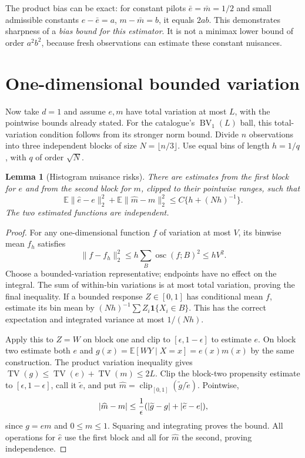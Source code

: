 \documentclass[11pt,a4paper]{article}
\newtheorem{lemma}[theorem]{Lemma}
\theoremstyle{definition}
\theoremstyle{remark}
\newcommand{\E}{\mathbb{E}}
\newcommand{\ind}{\mathbf{1}}
\begin{document}
The product bias can be exact: for constant pilots $\bar e=\bar m=1/2$ and small admissible constants $e-\bar e=a$, $m-\bar m=b$, it equals $2ab$. This demonstrates sharpness of a \emph{bias bound for this estimator}. It is not a minimax lower bound of order $a^2b^2$, because fresh observations can estimate these constant nuisances.
\section{One-dimensional bounded variation}
Now take $d=1$ and assume $e,m$ have total variation at most $L$, with the pointwise bounds already stated. For the catalogue's $\operatorname{BV}_1(L)$ ball, this total-variation condition follows from its stronger norm bound. Divide $n$ observations into three independent blocks of size $N=\lfloor n/3\rfloor$. Use equal bins of length $h=1/q$, with $q$ of order $\sqrt N$.
\begin{lemma}[Histogram nuisance risks]
There are estimates from the first block for $e$ and from the second block for $m$, clipped to their pointwise ranges, such that
\[
 \E\|\widehat e-e\|_2^2+\E\|\widehat m-m\|_2^2
 \le C\{h+(Nh)^{-1}\}.
\]
The two estimated functions are independent.
\end{lemma}
\begin{proof}
For any one-dimensional function $f$ of variation at most $V$, its binwise mean $f_h$ satisfies
\[
 \|f-f_h\|_2^2\le h\sum_B\operatorname{osc}(f;B)^2
                     \le h V^2.
\]
Choose a bounded-variation representative; endpoints have no effect on the integral. The sum of within-bin variations is at most total variation, proving the final inequality. If a bounded response $Z\in[0,1]$ has conditional mean $f$, estimate its bin mean by $(Nh)^{-1}\sum Z_i\ind\{X_i\in B\}$. This has the correct expectation and integrated variance at most $1/(Nh)$.

Apply this to $Z=W$ on block one and clip to $[\epsilon,1-\epsilon]$ to estimate $e$. On block two estimate both $e$ and $g(x)=\E[WY\mid X=x]=e(x)m(x)$ by the same construction. The product variation inequality gives $\operatorname{TV}(g)\le\operatorname{TV}(e)+\operatorname{TV}(m)\le2L$. Clip the block-two propensity estimate to $[\epsilon,1-\epsilon]$, call it $\widetilde e$, and put $\widehat m=\operatorname{clip}_{[0,1]}(\widetilde g/\widetilde e)$. Pointwise,
\[
 |\widehat m-m|\le {1\over\epsilon}
          (|\widetilde g-g|+|\widetilde e-e|),
\]
since $g=em$ and $0\le m\le1$. Squaring and integrating proves the bound. All operations for $\widehat e$ use the first block and all for $\widehat m$ the second, proving independence.
\end{proof}
\end{document}
